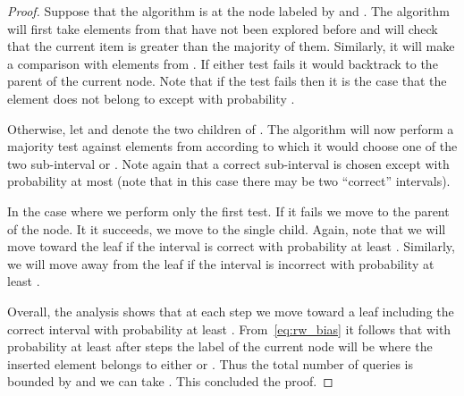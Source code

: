 \documentclass[11pt]{article}
\begin{document}
\begin{proof}
Suppose that the algorithm is at the node labeled by  and 
. 
The algorithm will first take  elements from  that have not been 
explored before and will check that the current item is greater than the 
majority of them. Similarly, it will make a comparison with  elements from 
. If either test fails it would backtrack to the 
parent of the current node. Note that if the test fails then it is the case
that the element does not belong to  except with probability 
. 

Otherwise, let  and  denote the two children of 
. The algorithm will now perform a majority test against  elements from  according to which it would choose one of the 
two sub-interval  or . Note again that a correct 
sub-interval is chosen except with probability at most  (note that 
in this case there may be two ``correct'' intervals). 

In the case where  we perform only the first test. If it fails 
we move to the parent of the node. It it succeeds, we move to the single child. 
Again, note that we will move toward the leaf if the interval is correct 
with probability at least . Similarly, we will move away from the leaf 
if the interval is incorrect with probability at least . 

Overall, the analysis shows that at each step we move toward a leaf including 
the correct interval with probability at least . From~\eqref{eq:rw_bias} it follows that with probability at least  after  steps 
the label of the current node will be  where the inserted element 
belongs to either  or . Thus the total number 
of queries is bounded by  and we can take
. This concluded the proof. 
\end{proof}


\newpage 



\end{document}
